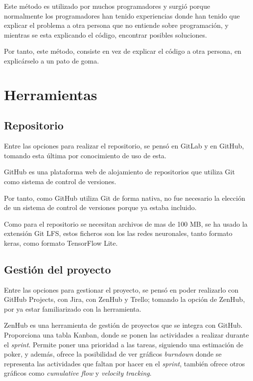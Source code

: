     Este método es utilizado por muchos programadores y surgió porque normalmente los programadores han tenido experiencias donde han tenido que explicar el problema a otra persona que no entiende sobre programación, y mientras se esta explicando el código, encontrar posibles soluciones. 
    
    Por tanto, este método, consiste en vez de explicar el código a otra persona, en explicárselo a un pato de goma.

\section{Herramientas}

    \subsection{Repositorio}
        Entre las opciones para realizar el repositorio, se pensó en GitLab y en GitHub, tomando esta última por conocimiento de uso de esta.

        GitHub es una plataforma web de alojamiento de repositorios que utiliza Git como sistema de control de versiones.

        Por tanto, como GitHub utiliza Git de forma nativa, no fue necesario la elección de un sistema de control de versiones porque ya estaba incluido.

        Como para el repositorio se necesitan archivos de mas de 100 MB, se ha usado la extensión Git LFS, estos ficheros son los las redes neuronales, tanto formato keras, como formato TensorFlow Lite.
    \subsection{Gestión del proyecto}
        Entre las opciones para gestionar el proyecto, se pensó en poder realizarlo con GitHub Projects, con Jira, con ZenHub y Trello; tomando la opción de ZenHub, por ya estar familiarizado con la herramienta.

        ZenHub es una herramienta de gestión de proyectos que se integra con GitHub. Proporciona una tabla Kanban, donde se ponen las actividades a realizar durante el \textit{sprint}. Permite poner una prioridad a las tareas, siguiendo una estimación de poker, y además, ofrece la posibilidad de ver gráficos \textit{burndown} donde se representa las actividades que faltan por hacer en el \textit{sprint}, también ofrece otros gráficos como \textit{cumulative flow} y \textit{velocity tracking}.

